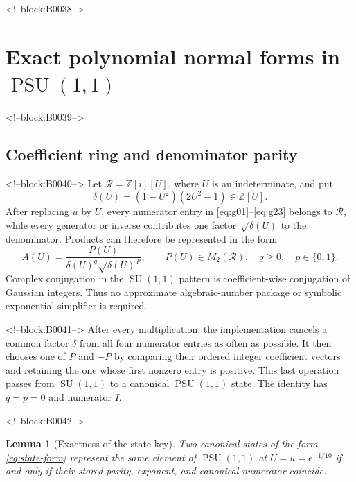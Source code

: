 \documentclass[11pt,a4paper]{article}
\newtheorem{lemma}[theorem]{Lemma}
\theoremstyle{definition}
\newcommand{\Z}{\mathbb Z}
\newcommand{\PSU}{\operatorname{PSU}}
\newcommand{\SU}{\operatorname{SU}}
\begin{document}
<!--block:B0038-->
\section{Exact polynomial normal forms in \texorpdfstring{\(\PSU(1,1)\)}{PSU(1,1)}}
\label{sec:normal-form}

<!--block:B0039-->
\subsection{Coefficient ring and denominator parity}

<!--block:B0040-->
Let \(\mathcal R=\Z[i][U]\), where \(U\) is an indeterminate, and put
\[
 \delta(U)=(1-U^2)(2U^2-1)\in\Z[U].
\]
After replacing \(u\) by \(U\), every numerator entry in
\eqref{eq:g01}--\eqref{eq:g23} belongs to \(\mathcal R\), while every generator
or inverse contributes one factor \(\sqrt{\delta(U)}\) to the denominator.
Products can therefore be represented in the form
\begin{equation}\label{eq:state-form}
 A(U)=\frac{P(U)}{\delta(U)^q\sqrt{\delta(U)}^{\,p}},
 \qquad P(U)\in M_2(\mathcal R),\quad q\geq0,\quad p\in\{0,1\}.
\end{equation}
Complex conjugation in the \(\SU(1,1)\) pattern is coefficient-wise
conjugation of Gaussian integers.  Thus no approximate algebraic-number
package or symbolic exponential simplifier is required.

<!--block:B0041-->
After every multiplication, the implementation cancels a common factor
\(\delta\) from all four numerator entries as often as possible.  It then
chooses one of \(P\) and \(-P\) by comparing their ordered integer coefficient
vectors and retaining the one whose first nonzero entry is positive.  This
last operation passes from \(\SU(1,1)\) to a canonical \(\PSU(1,1)\) state.
The identity has \(q=p=0\) and numerator \(I\).

<!--block:B0042-->
\begin{lemma}[Exactness of the state key]\label{lem:key}
Two canonical states of the form \eqref{eq:state-form} represent the same
element of \(\PSU(1,1)\) at \(U=u=e^{-1/10}\) if and only if their stored
parity, exponent, and canonical numerator coincide.
\end{lemma}
\end{document}
